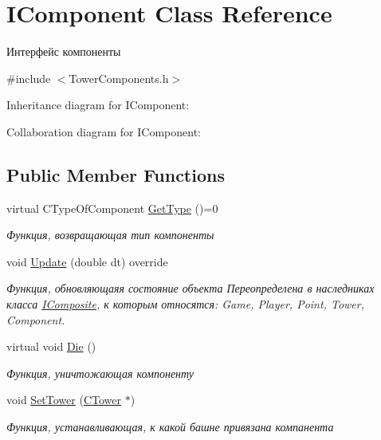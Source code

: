 \hypertarget{classIComponent}{}\section{I\+Component Class Reference}
\label{classIComponent}


Интерфейс компоненты  




{\ttfamily \#include $<$Tower\+Components.\+h$>$}



Inheritance diagram for I\+Component\+:


Collaboration diagram for I\+Component\+:
\subsection*{Public Member Functions}
\begin{DoxyCompactItemize}
\item 
virtual C\+Type\+Of\+Component \hyperlink{classIComponent_abc6bea1a66ef9d2227373e0ff8553b75}{Get\+Type} ()=0
\begin{DoxyCompactList}\small\item\em Функция, возвращающая тип компоненты \end{DoxyCompactList}\item 
void \hyperlink{classIComponent_a12217e57a33f8978af5610511eaddad5}{Update} (double dt) override
\begin{DoxyCompactList}\small\item\em Функция, обновляющаяя состояние объекта Переопределена в наследниках класса \hyperlink{classIComposite}{I\+Composite}, к которым относятся\+: Game, Player, Point, Tower, Component. \end{DoxyCompactList}\item 
virtual void \hyperlink{classIComponent_a0316e5555d3f8db1bac9c825f874175f}{Die} ()\hypertarget{classIComponent_a0316e5555d3f8db1bac9c825f874175f}{}\label{classIComponent_a0316e5555d3f8db1bac9c825f874175f}

\begin{DoxyCompactList}\small\item\em Функция, уничтожающая компоненту \end{DoxyCompactList}\item 
void \hyperlink{classIComponent_a2ca444b58689635dc1a7d71d2a582b75}{Set\+Tower} (\hyperlink{classCTower}{C\+Tower} $\ast$)\hypertarget{classIComponent_a2ca444b58689635dc1a7d71d2a582b75}{}\label{classIComponent_a2ca444b58689635dc1a7d71d2a582b75}

\begin{DoxyCompactList}\small\item\em Функция, устанавливающая, к какой башне привязана компанента \end{DoxyCompactList}\end{DoxyCompactItemize}


